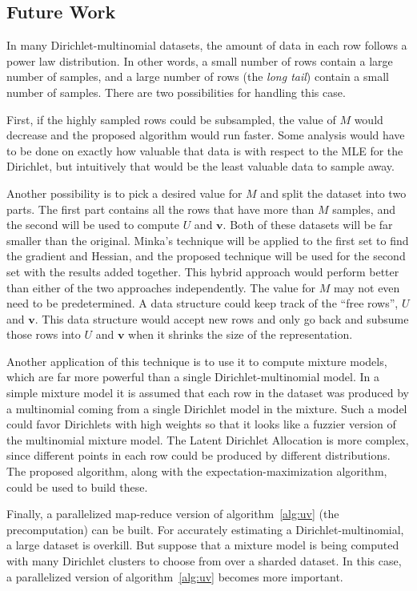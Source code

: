\documentclass[twoside]{article}
\begin{document}
\subsection{Future Work}

In many Dirichlet-multinomial datasets, the amount of data in each row follows a power law distribution.  In other words, a small number of rows contain a large number of samples, and a large number of rows (the \textit{long tail}) contain a small number of samples.  There are two possibilities for handling this case.

First, if the highly sampled rows could be subsampled, the value of $M$ would decrease and the proposed algorithm would run faster. Some analysis would have to be done on exactly how valuable that data is with respect to the MLE for the Dirichlet, but intuitively that would be the least valuable data to sample away.

Another possibility is to pick a desired value for $M$ and split the dataset into two parts.  The first part contains all the rows that have more than $M$ samples, and the second will be used to compute $U$ and $\mathbf{v}$.  Both of these datasets will be far smaller than the original.  Minka's technique will be applied to the first set to find the gradient and Hessian, and the proposed technique will be used for the second set with the results added together.  This hybrid approach would perform better than either of the two approaches independently. The value for $M$ may not even need to be predetermined. A data structure could keep track of the ``free rows'', $U$ and $\mathbf{v}$.  This data structure would accept new rows and only go back and subsume those rows into $U$ and $\mathbf{v}$ when it shrinks the size of the representation.

Another application of this technique is to use it to compute mixture models, which are far more powerful than a single Dirichlet-multinomial model.  In a simple mixture model it is assumed that each row in the dataset was produced by a multinomial coming from a single Dirichlet model in the mixture.  Such a model could favor Dirichlets with high weights so that it looks like a fuzzier version of the multinomial mixture model.  The Latent Dirichlet Allocation is more complex, since different points in each row could be produced by different distributions.  The proposed algorithm, along with the expectation-maximization algorithm, could be used to build these.

Finally, a parallelized map-reduce version of algorithm~\ref{alg:uv} (the precomputation) can be built.  For accurately estimating a Dirichlet-multinomial, a large dataset is overkill.  But suppose that a mixture model is being computed with many Dirichlet clusters to choose from over a sharded dataset.  In this case, a parallelized version of algorithm~\ref{alg:uv} becomes more important.
\end{document}
